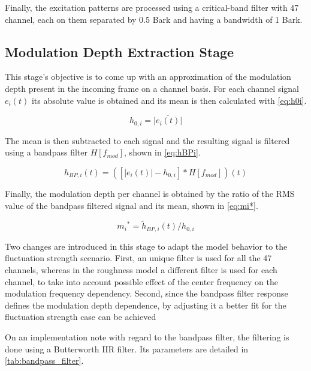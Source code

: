 \documentclass[../main.tex]{subfiles}
\begin{document}
\begin{modelchapter}
Finally, the excitation patterns are processed using a critical-band filter with
47 channel, each on them separated by 0.5 Bark and having a bandwidth of 1 Bark.

\subsection{Modulation Depth Extraction Stage}

This stage's objective is to come up with an approximation of the modulation
depth present in the incoming frame on a channel basis. For each channel signal
$e_{i}(t)$ its absolute value is obtained and its mean is then calculated with
\cref{eq:h0i}.

\begin{equation}
  h_{0,i} = \overline{|e_{i}(t)|}
  \label{eq:h0i}
\end{equation}

The mean is then subtracted to each signal and the resulting signal is filtered
using a bandpass filter $H[f_{mod}]$, shown in \cref{eq:hBPi}.

\begin{equation}
  h_{BP,i}(t) = ([|e_{i}(t)| - h_{0,i}] * H[f_{mod}])(t)
  \label{eq:hBPi}
\end{equation}

Finally, the modulation depth per channel is obtained by the ratio of the
\gls{RMS} value of the bandpass filtered signal and its mean, shown in
\cref{eq:mi*}.

\begin{equation}
  {m_i}^* = \tilde{h}_{BP,i}(t)/h_{0,i}
  \label{eq:mi*}
\end{equation}

Two changes are introduced in this stage to adapt the model behavior to the
fluctuation strength scenario. First, an unique filter is used for all the 47
channels, whereas in the roughness model a different filter is used for each
channel, to take into account possible effect of the center frequency on the
modulation frequency dependency. Second, since the bandpass filter response
defines the modulation depth dependence, by adjusting it a better fit for the
fluctuation strength case can be achieved

On an implementation note with regard to the bandpass filter, the filtering is
done using a Butterworth \gls{IIR} filter. Its parameters are detailed in
\cref{tab:bandpass_filter}.


\end{modelchapter}
\end{document}
